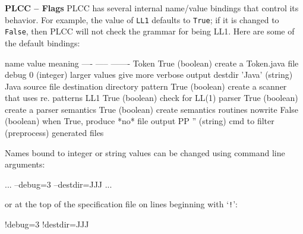 \begin{minipage}[t]{\sw}
\slidenumber
\LARGE
{\bf PLCC -- Flags}\exx
PLCC has several internal name/value bindings that control its behavior.
For example, the value of \verb'LL1' defaults to \verb'True';
if it is changed to \verb'False',
then PLCC will not check the grammar for being LL1.
Here are some of the default bindings:
{\Large
\begin{qv}
name      value  meaning
----      -----  -------
Token     True   (boolean) create a Token.java file
debug     0      (integer) larger values give more verbose output
destdir   'Java' (string)  Java source file destination directory
pattern   True   (boolean) create a scanner that uses re. patterns
LL1       True   (boolean) check for LL(1)
parser    True   (boolean) create a parser
semantics True   (boolean) create semantics routines
nowrite   False  (boolean) when True, produce *no* file output
PP        ''     (string)  cmd to filter (preprocess) generated files
\end{qv}
}
Names bound to integer or string values can be changed
using command line arguments:
{\Large
\begin{qv}
... --debug=3 --destdir=JJJ ...
\end{qv}
}
or at the top of the specification file
on lines beginning with `\verb'!'':
{\Large
\begin{qv}
!debug=3
!destdir=JJJ
\end{qv}
}
\end{minipage}
\clearpage
